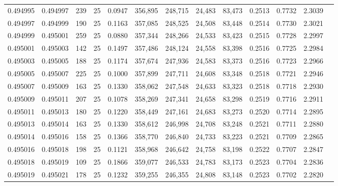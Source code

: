\begin{tabular}{rrrrrrrrrrrrr}
0.494995 & 0.494997 &   239 &  25 &                                     0.0947 & 356,895 & 248,715 &  24,483 &  83,473 & 0.2513 & 0.7732 & 2.3039 \\
0.494997 & 0.494999 &   190 &  25 &                                     0.1163 & 357,085 & 248,525 &  24,508 &  83,448 & 0.2514 & 0.7730 & 2.3021 \\
0.494999 & 0.495001 &   259 &  25 &                                     0.0880 & 357,344 & 248,266 &  24,533 &  83,423 & 0.2515 & 0.7728 & 2.2997 \\
0.495001 & 0.495003 &   142 &  25 &                                     0.1497 & 357,486 & 248,124 &  24,558 &  83,398 & 0.2516 & 0.7725 & 2.2984 \\
0.495003 & 0.495005 &   188 &  25 &                                     0.1174 & 357,674 & 247,936 &  24,583 &  83,373 & 0.2516 & 0.7723 & 2.2966 \\
0.495005 & 0.495007 &   225 &  25 &                                     0.1000 & 357,899 & 247,711 &  24,608 &  83,348 & 0.2518 & 0.7721 & 2.2946 \\
0.495007 & 0.495009 &   163 &  25 &                                     0.1330 & 358,062 & 247,548 &  24,633 &  83,323 & 0.2518 & 0.7718 & 2.2930 \\
0.495009 & 0.495011 &   207 &  25 &                                     0.1078 & 358,269 & 247,341 &  24,658 &  83,298 & 0.2519 & 0.7716 & 2.2911 \\
0.495011 & 0.495013 &   180 &  25 &                                     0.1220 & 358,449 & 247,161 &  24,683 &  83,273 & 0.2520 & 0.7714 & 2.2895 \\
0.495013 & 0.495014 &   163 &  25 &                                     0.1330 & 358,612 & 246,998 &  24,708 &  83,248 & 0.2521 & 0.7711 & 2.2880 \\
0.495014 & 0.495016 &   158 &  25 &                                     0.1366 & 358,770 & 246,840 &  24,733 &  83,223 & 0.2521 & 0.7709 & 2.2865 \\
0.495016 & 0.495018 &   198 &  25 &                                     0.1121 & 358,968 & 246,642 &  24,758 &  83,198 & 0.2522 & 0.7707 & 2.2847 \\
0.495018 & 0.495019 &   109 &  25 &                                     0.1866 & 359,077 & 246,533 &  24,783 &  83,173 & 0.2523 & 0.7704 & 2.2836 \\
0.495019 & 0.495021 &   178 &  25 &                                     0.1232 & 359,255 & 246,355 &  24,808 &  83,148 & 0.2523 & 0.7702 & 2.2820 \\

\end{tabular}
